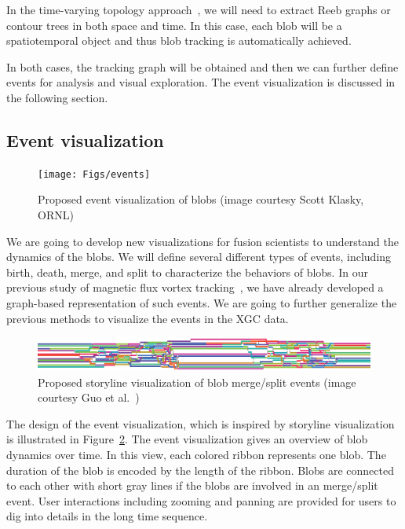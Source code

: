 In the time-varying topology approach~\cite{SohnB06}, we will need to extract Reeb graphs or contour trees in both space and time.  In this case, each blob will be a spatiotemporal object and thus blob tracking is automatically achieved.  

In both cases, the tracking graph will be obtained and then we can further define events for analysis and visual exploration.  The event visualization is discussed in the following section.  


\subsection{Event visualization}

\begin{figure}
  \centering
  \texttt{[image: Figs/events]}
  \caption{Proposed event visualization of blobs (image courtesy Scott Klasky, ORNL)}
  \label{fig:events}
\end{figure}

We are going to develop new visualizations for fusion scientists to understand the dynamics of the blobs.  We will define several different types of events, including birth, death, merge, and split to characterize the behaviors of blobs.  In our previous study of magnetic flux vortex tracking~\cite{GuoPPKG16, GuoPG17, PhillipsGPKG16, PhillipsPKG15}, we have already developed a graph-based representation of such events.  We are going to further generalize the previous methods to visualize the events in the XGC data.  

\begin{figure}
  \centering
  \includegraphics[width=\linewidth]{Figs/storyline}
  \caption{Proposed storyline visualization of blob merge/split events (image courtesy Guo et al.~\cite{GuoPPKG16})}
  \label{fig:storyline}
\end{figure}

The design of the event visualization, which is inspired by storyline visualization~\cite{TanahashiM12} is illustrated in Figure~\ref{fig:storyline}.  The event visualization gives an overview of blob dynamics over time.  In this view, each colored ribbon represents one blob.  The duration of the blob is encoded by the length of the ribbon.  Blobs are connected to each other with short gray lines if the blobs are involved in an merge/split event.  User interactions including zooming and panning are provided for users to dig into details in the long time sequence.  

